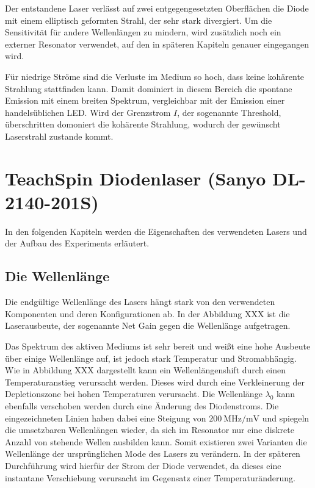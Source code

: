 
Der entstandene Laser verlässt auf zwei entgegengesetzten Oberflächen die Diode mit einem elliptisch geformten Strahl, der sehr stark divergiert. Um die Sensitivität für andere Wellenlängen zu mindern, wird zusätzlich noch ein externer Resonator verwendet, auf den in späteren Kapiteln genauer eingegangen wird.

Für niedrige Ströme sind die Verluste im Medium so hoch, dass keine kohärente Strahlung stattfinden kann. Damit dominiert in diesem Bereich die spontane Emission mit einem breiten Spektrum, vergleichbar mit der Emission einer handelsüblichen LED. Wird der Grenzstrom $I$, der sogenannte Threshold, überschritten domoniert die kohärente Strahlung, wodurch der gewünscht Laserstrahl zustande kommt.

\section{TeachSpin Diodenlaser (Sanyo DL-2140-201S)} 

In den folgenden Kapiteln werden die Eigenschaften des verwendeten Lasers und der Aufbau des Experiments erläutert.

\subsection{Die Wellenlänge}
Die endgültige Wellenlänge des Lasers hängt stark von den verwendeten Komponenten und deren Konfigurationen ab. In der Abbildung XXX ist die Laserausbeute, der sogenannte Net Gain gegen die Wellenlänge aufgetragen.


Das Spektrum des aktiven Mediums ist sehr bereit und weißt eine hohe Ausbeute über einige Wellenlänge auf, ist jedoch stark Temperatur und Stromabhängig. Wie in Abbildung XXX dargestellt kann ein Wellenlängenshift durch einen Temperaturanstieg verursacht werden. Dieses wird durch eine Verkleinerung der Depletionszone bei hohen Temperaturen verursacht. Die Wellenlänge $\lambda_0$ kann ebenfalls verschoben werden durch eine Änderung des Diodenstroms. Die eingezeichneten Linien haben dabei eine Steigung von $\SI{200}{\mega\hertz\per\milli\volt}$ und spiegeln die umsetzbaren Wellenlängen wieder, da sich im Resonator nur eine diskrete Anzahl von stehende Wellen ausbilden kann. Somit existieren zwei Varianten die Wellenlänge der ursprünglichen Mode des Lasers zu verändern. In der späteren Durchführung wird hierfür der Strom der Diode verwendet, da dieses eine instantane Verschiebung verursacht im Gegensatz einer Temperaturänderung.

